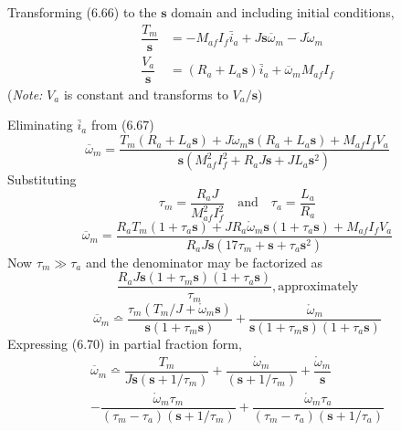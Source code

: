 \documentclass[a4paper,numbers=noenddot,12pt]{scrbook}
\begin{document}
Transforming (6.66) to the $\textbf{s}$ domain and including initial conditions,
\begin{equation}
    \begin{aligned}
        \dfrac{T_m}{\mathbf{s}} & = - M_{af} I_f \bar i_a + J\mathbf{s} \overline \omega_m - J \mathring \omega_m \\ %
        \dfrac{V_a}{\mathbf{s}} & = (R_a + L_a\mathbf{s})\bar i_a + \overline \omega_m M_{af} I_f %
    \end{aligned}
    \label{eq:Eq.6.67}
\end{equation}
(\textit{Note:} $V_a$ is constant and transforms to $V_a/\mathbf{s}$)

Eliminating $\bar i_a$ from (6.67) %
\begin{equation}
    \overline \omega_m = \dfrac{T_m (R_a + L_a \mathbf{s}) + J \mathring \omega_m \mathbf{s}(R_a + L_a \mathbf{s}) + M_{af} I_f V_a}{\mathbf{s}(M_{af}^2 I_f^2 + R_a J \mathbf{s} + J L_a \mathbf{s}^2)}
    \label{eq:Eq6.68}
\end{equation}
Substituting
\begin{equation*}
    \tau_m = \dfrac{R_a J}{M_{af}^2 I_f^2} \quad \text{and} \quad \tau_a = \dfrac{L_a}{R_a}
    \label{}
\end{equation*}
\begin{equation}
    \overline \omega_m = \dfrac{R_a T_m (1 + \tau_a \mathbf{s}) + J R_a \mathring \omega_m \mathbf{s}(1 + \tau_a \mathbf{s}) + M_{af} I_f V_a}{R_a J \mathbf{s}(17\tau_m + \mathbf{s} + \tau_a \mathbf{s}^2)}
    \label{eq:Eq6.69}
\end{equation}
Now $\tau_m \gg \tau_a$ and the denominator may be factorized as
\begin{equation*}
    \dfrac{R_a J \mathbf{s}(1 + \tau_m \mathbf{s})(1 + \tau_a \mathbf{s})}{\tau_m},\text{approximately}
    \label{}
\end{equation*}
\begin{equation}
    \overline \omega_m \bumpeq \dfrac{\tau_m (T_m/J + \mathring \omega_m \mathbf{s})}{\mathbf{s}(1 + \tau_m \mathbf{s})} + \dfrac{\mathring \omega_m}{\mathbf{s}(1 + \tau_m \mathbf{s})(1 + \tau_a \mathbf{s})}
    \label{eq:Eq6.70}
\end{equation}
Expressing (6.70) in partial fraction form,
\begin{multline}
    \overline \omega_m \bumpeq \dfrac{T_m}{J \mathbf{s}(\mathbf{s} + 1 / \tau_m)} + \dfrac{\mathring \omega_m}{(\mathbf{s} + 1 / \tau_m)} + \dfrac{\mathring \omega_m}{\mathbf{s}} \\
    - \dfrac{\mathring \omega_m \tau_m}{(\tau_m - \tau_a)(\mathbf{s} + 1 / \tau_m)} + \dfrac{\mathring\omega_m \tau_a}{(\tau_m - \tau_a)(\mathbf{s} + 1 / \tau_a)}
    \label{eq:Eq6.71}
\end{multline}
\end{document}
